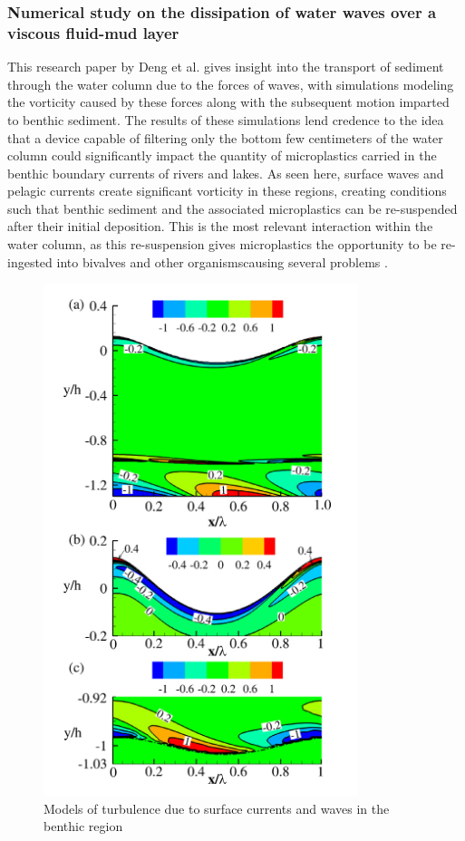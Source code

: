 \documentclass[fleqn,10pt]{SelfArx} %
\begin{document}
	\subsubsection*{Numerical study on the dissipation of water waves over a viscous fluid-mud layer}
	This research paper by Deng et al. gives insight into the transport of sediment through the water column due to the forces of waves, with simulations modeling the vorticity caused by these forces along with the subsequent motion imparted to benthic sediment. The results of these simulations lend credence to the idea that a device capable of filtering only the bottom few centimeters of the water column could significantly impact the quantity of microplastics carried in the benthic boundary currents of rivers and lakes. As seen here, surface waves and pelagic currents create significant vorticity in these regions, creating conditions such that benthic sediment and the associated microplastics can be re-suspended after their initial deposition. This is the most relevant interaction within the water column, as this re-suspension gives microplastics the opportunity to be re-ingested into bivalves and other organisms\textemdash causing several problems \cite{Deng_Hu_Guo_Dalrymple_Shen_2017}.
	\begin{figure}[h]
		\centering
		\includegraphics[width=0.5\linewidth]{Figures/RiverTurbulence.png}
		\caption[Benthic Turbulence Models]{Models of turbulence due to surface currents and waves in the benthic region}
		\label{fig:TurbulenceBenthic}
	\end{figure}
\end{document}
